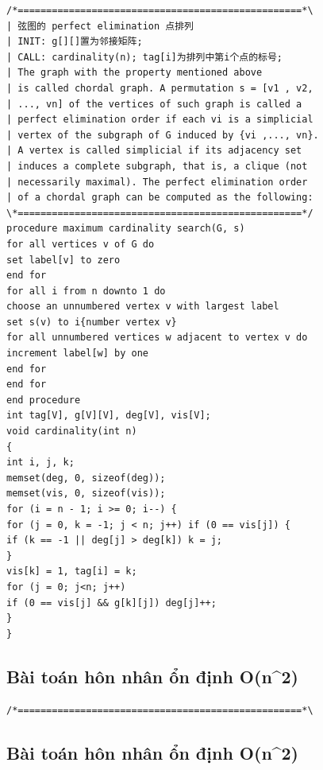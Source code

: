 \documentclass[11pt]{article}
\begin{document}
\begingroup
\scriptsize
\begin{verbatim}
/*==================================================*\
| 弦图的 perfect elimination 点排列
| INIT: g[][]置为邻接矩阵;
| CALL: cardinality(n); tag[i]为排列中第i个点的标号;
| The graph with the property mentioned above
| is called chordal graph. A permutation s = [v1 , v2,
| ..., vn] of the vertices of such graph is called a
| perfect elimination order if each vi is a simplicial
| vertex of the subgraph of G induced by {vi ,..., vn}.
| A vertex is called simplicial if its adjacency set
| induces a complete subgraph, that is, a clique (not
| necessarily maximal). The perfect elimination order
| of a chordal graph can be computed as the following:
\*==================================================*/
procedure maximum cardinality search(G, s)
for all vertices v of G do
set label[v] to zero
end for
for all i from n downto 1 do
choose an unnumbered vertex v with largest label
set s(v) to i{number vertex v}
for all unnumbered vertices w adjacent to vertex v do
increment label[w] by one
end for
end for
end procedure
int tag[V], g[V][V], deg[V], vis[V];
void cardinality(int n)
{
int i, j, k;
memset(deg, 0, sizeof(deg));
memset(vis, 0, sizeof(vis));
for (i = n - 1; i >= 0; i--) {
for (j = 0, k = -1; j < n; j++) if (0 == vis[j]) {
if (k == -1 || deg[j] > deg[k]) k = j;
}
vis[k] = 1, tag[i] = k;
for (j = 0; j<n; j++)
if (0 == vis[j] && g[k][j]) deg[j]++;
}
}
\end{verbatim}
\endgroup

\subsection{Bài toán hôn nhân ổn định O(n\textasciicircum{}2)}

\begingroup
\scriptsize
\begin{verbatim}
/*==================================================*\
\end{verbatim}
\endgroup

\subsection{Bài toán hôn nhân ổn định O(n\textasciicircum{}2)}
\end{document}
